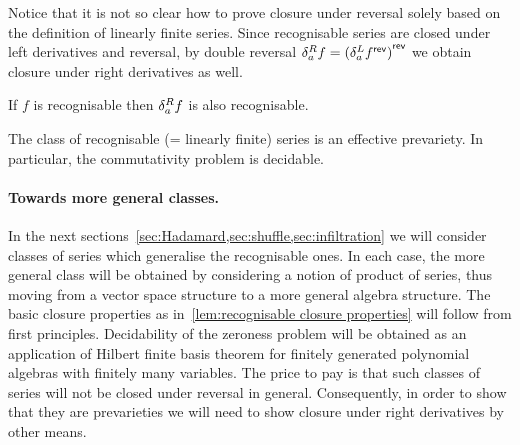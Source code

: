 %
\noindent
Notice that it is not so clear how to prove closure under reversal
solely based on the definition of linearly finite series.
%
Since recognisable series are closed under left derivatives and reversal,
by double reversal $\delta^R_{a} f = {(\delta^L_{a} {f}^\mathsf{rev})}^\mathsf{rev}$
we obtain closure under right derivatives as well.
%
\begin{corollary}
    \label{cor:recognisable derive right}
    If $f$ is recognisable then $\delta^R_{a} f$ is also recognisable.
\end{corollary}

\begin{theorem}
    The class of recognisable (= linearly finite) series is an effective prevariety.
    In particular, the commutativity problem is decidable.
\end{theorem}


\paragraph{Towards more general classes.}

In the next sections~\cref{sec:Hadamard,sec:shuffle,sec:infiltration}
we will consider classes of series which generalise the recognisable ones.
%
In each case, the more general class will be obtained by considering a notion of product of series,
thus moving from a vector space structure to a more general algebra structure.
%
The basic closure properties as in~\cref{lem:recognisable closure properties} will follow from first principles.
%
Decidability of the zeroness problem will be obtained as an application of Hilbert finite basis theorem
for finitely generated polynomial algebras with finitely many variables.
%
The price to pay is that such classes of series will not be closed under reversal in general.
%
Consequently, in order to show that they are prevarieties
we will need to show closure under right derivatives by other means.
